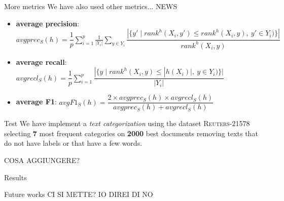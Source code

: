 \begin{frame}{More metrics}
	\color{red}We have also used other metrics... NEWS
	\begin{itemize}
	\item \textbf{average precision}: $avgprec_S(h) = \dfrac{1}{p}\sum_{i=1}^{p}\frac{1}{|Y_i|}\sum_{y \in Y_i} \dfrac{| \{ y' \mid rank^h(X_i,y') \leq rank^h(X_i,y), \ y' \in Y_i) \} |}{rank^h(X_i,y)}$
	\item \textbf{average recall}: $avgrecl_S(h) = \dfrac{1}{p}\sum_{i=1}^{p} \dfrac{| \{ y \mid rank^h(X_i,y) \leq |h(X_i)|, \ y \in Y_i) \} |}{|Y_i|}$
	\item \textbf{average F1}: $avgF1_S(h) = \dfrac{2\times avgprec_S(h)\times avgrecl_S(h)}{avgprec_S(h)+avgrecl_S(h)}$
	\end{itemize}
	\begin{flushright}
		\cite{metrics}
	\end{flushright}
\end{frame}

\begin{frame}{Test}
	We have implement a \textit{text categorization} using the dataset \textsc{Reuters-21578} selecting \textbf{7} most frequent categories on \textbf{2000} best documents removing texts that do not have labels or that have a few words.
	
	\color{red} COSA AGGIUNGERE?
\end{frame}

\begin{frame}{Results}
	
\end{frame}

\begin{frame}{Future works}
	CI SI METTE? IO DIREI DI NO
\end{frame}